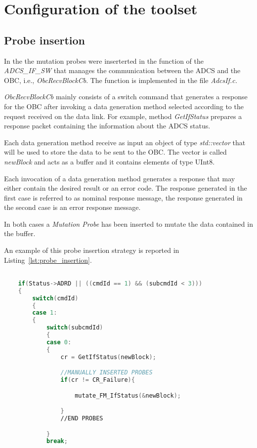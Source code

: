 
\chapter{Configuration of the toolset}

\section{Probe insertion}

In the \case the mutation probes were inserterted in the function of the \emph{ADCS\_IF\_SW} that manages the communication between the ADCS and the OBC, i.e., \emph{ObcRecvBlockCb}. The function is implemented in the file \emph{AdcsIf.c.}

\emph{ObcRecvBlockCb} mainly consists of a switch command that generates a response for the OBC after invoking a data generation method selected according to the request received on the data link. For example, method \emph{GetIfStatus} prepares a response packet containing the information about the ADCS status.

Each data generation method receive as input an object of type \emph{std::vector} that will be used to store the data to be sent to the OBC. The vector is called \emph{newBlock} and acts as a buffer and it contains elements of type UInt8.

Each invocation of a data generation method generates a response that may either contain the desired result or an error code. The response generated in the first case is referred to as nominal response message, the response generated in the second case is an error response message.

In both cases a \emph{Mutation Probe} has been inserted to mutate the data contained in the buffer.

An example of this probe insertion strategy is reported in Listing~\ref{lst:probe_insertion}.

\begin{lstlisting}[language=C++, caption=Probe insertion Strategy, label={lst:probe_insertion}]

    if(Status->ADRD || ((cmdId == 1) && (subcmdId < 3)))
    {
        switch(cmdId)
        {
        case 1:
        {
            switch(subcmdId)
            {
            case 0:
            {
                cr = GetIfStatus(newBlock);

                //MANUALLY INSERTED PROBES
                if(cr != CR_Failure){

      		        mutate_FM_IfStatus(&newBlock);

                }
                //END PROBES

            }
            break;

\end{lstlisting}

